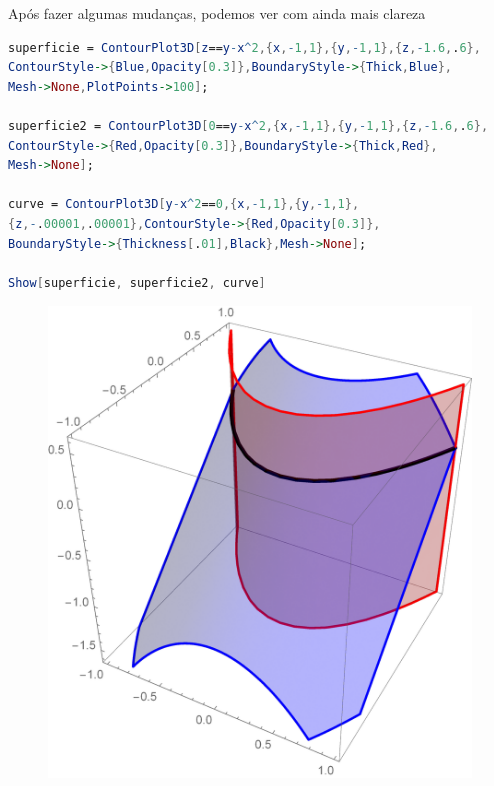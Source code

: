 \documentclass[a4paper, 12pt]{article}
\begin{document}
Após fazer algumas mudanças, podemos ver com ainda mais clareza

\begin{lstlisting}[language=Mathematica]
superficie = ContourPlot3D[z==y-x^2,{x,-1,1},{y,-1,1},{z,-1.6,.6}, 
ContourStyle->{Blue,Opacity[0.3]},BoundaryStyle->{Thick,Blue},
Mesh->None,PlotPoints->100];

superficie2 = ContourPlot3D[0==y-x^2,{x,-1,1},{y,-1,1},{z,-1.6,.6}, 
ContourStyle->{Red,Opacity[0.3]},BoundaryStyle->{Thick,Red},
Mesh->None];

curve = ContourPlot3D[y-x^2==0,{x,-1,1},{y,-1,1},
{z,-.00001,.00001},ContourStyle->{Red,Opacity[0.3]},
BoundaryStyle->{Thickness[.01],Black},Mesh->None];

Show[superficie, superficie2, curve]
\end{lstlisting}
\begin{figure}[!h]
	\centering
	\includegraphics[scale=.5]{images/Together}
\end{figure}
\end{document}
